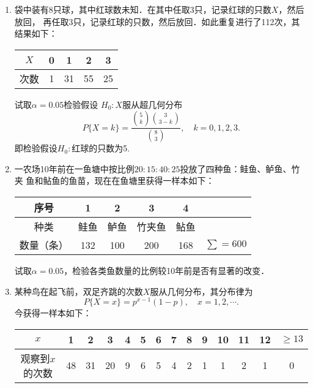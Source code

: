 \documentclass[10pt,a4paper]{article}
\begin{document}
\begin{enumerate}
    \item 袋中装有8只球，其中红球数未知．在其中任取3只，记录红球的只数$X$，然后放回，
    再任取3只，记录红球的只数，然后放回．如此重复进行了112次，其结果如下：
    \renewcommand{\arraystretch}{1.3}
    \begin{table}[H]\centering
        \begin{tabular}{c|cccc}
        $X$ & 0 & 1  & 2  & 3  \\ \hline
        次数  & 1 & 31 & 55 & 25
        \end{tabular}
        \end{table}
    \renewcommand{\arraystretch}{1.0}
    试取$\alpha=0.05$检验假设
    $H_0:X$服从超几何分布
    $$P\{X=k\}=\dfrac{\binom{5}{k} \binom{3}{3-k}} {\binom{8}{3}} ,\quad k=0,1,2,3.$$
    即检验假设$H_0:$红球的只数为5.






    \item 一农场10年前在一鱼塘中按比例$20:15:40:25$投放了四种鱼：鲑鱼、鲈鱼、竹夹
    鱼和鲇鱼的鱼苗，现在在鱼塘里获得一样本如下：
    \renewcommand{\arraystretch}{1.3}
    \begin{table}[H]\centering
        \begin{tabular}{c|ccccc}
        \hline
        序号    & 1   & 2   & 3   & 4   &            \\ \hline
        种类    & 鲑鱼  & 鲈鱼  & 竹夹鱼 & 鲇鱼  &            \\ \hline
        数量（条） & 132 & 100 & 200 & 168 & $\sum=600$ \\ \hline
        \end{tabular}
    \end{table}
    \renewcommand{\arraystretch}{1.0}
    试取$\alpha=0.05$，检验各类鱼数量的比例较10年前是否有显著的改变．




    \item 某种鸟在起飞前，双足齐跳的次数$X$服从几何分布，其分布律为
    $$P\{X=x\}=p^{x-1}(1-p),\quad x=1,2,\cdots.$$
    今获得一样本如下：
    \renewcommand{\arraystretch}{1.3}
    \begin{table}[H]\centering
        \begin{tabular}{c|ccccccccccccc}
        $x$       & 1  & 2  & 3  & 4 & 5 & 6 & 7 & 8 & 9 & 10 & 11 & 12 & $\geq 13$ \\ \hline
        观察到$x$的次数 & 48 & 31 & 20 & 9 & 6 & 5 & 4 & 2 & 1 & 1  & 2  & 1  & 0        
        \end{tabular}
    \end{table}
    \renewcommand{\arraystretch}{1.0}






\end{enumerate}
\end{document}
